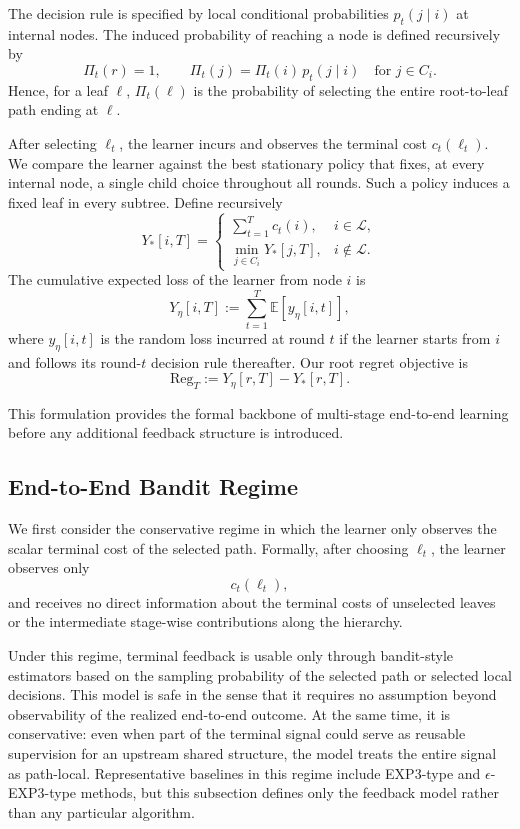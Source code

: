 The decision rule is specified by local conditional probabilities $p_t(j \mid i)$ at internal nodes. The induced probability of reaching a node is defined recursively by
\[
\Pi_t(r) = 1,
\qquad
\Pi_t(j) = \Pi_t(i)\, p_t(j \mid i)
\quad \text{for } j \in C_i.
\]
Hence, for a leaf $\ell$, $\Pi_t(\ell)$ is the probability of selecting the entire root-to-leaf path ending at $\ell$.

After selecting $\ell_t$, the learner incurs and observes the terminal cost $c_t(\ell_t)$. We compare the learner against the best stationary policy that fixes, at every internal node, a single child choice throughout all rounds. Such a policy induces a fixed leaf in every subtree. Define recursively
\[
Y_\ast[i,T] =
\begin{cases}
\sum_{t=1}^T c_t(i), & i \in \mathcal{L},\\[4pt]
\min_{j \in C_i} Y_\ast[j,T], & i \notin \mathcal{L}.
\end{cases}
\]
The cumulative expected loss of the learner from node $i$ is
\[
Y_\eta[i,T] := \sum_{t=1}^T \mathbb{E}[y_\eta[i,t]],
\]
where $y_\eta[i,t]$ is the random loss incurred at round $t$ if the learner starts from $i$ and follows its round-$t$ decision rule thereafter. Our root regret objective is
\[
\mathrm{Reg}_T := Y_\eta[r,T] - Y_\ast[r,T].
\]

This formulation provides the formal backbone of multi-stage end-to-end learning before any additional feedback structure is introduced.

\subsection{End-to-End Bandit Regime}

We first consider the conservative regime in which the learner only observes the scalar terminal cost of the selected path. Formally, after choosing $\ell_t$, the learner observes only
\[
c_t(\ell_t),
\]
and receives no direct information about the terminal costs of unselected leaves or the intermediate stage-wise contributions along the hierarchy.

Under this regime, terminal feedback is usable only through bandit-style estimators based on the sampling probability of the selected path or selected local decisions. This model is safe in the sense that it requires no assumption beyond observability of the realized end-to-end outcome. At the same time, it is conservative: even when part of the terminal signal could serve as reusable supervision for an upstream shared structure, the model treats the entire signal as path-local. Representative baselines in this regime include EXP3-type and $\epsilon$-EXP3-type methods, but this subsection defines only the feedback model rather than any particular algorithm.

